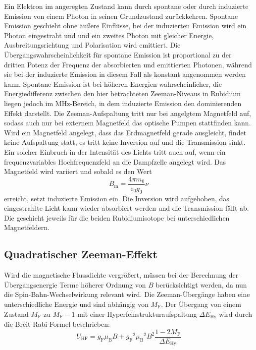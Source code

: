 Ein Elektron im angeregten Zustand kann durch spontane oder durch induzierte Emission von einem
Photon in seinen Grundzustand zurückkehren. Spontane Emission geschieht ohne äußere Einflüsse,
bei der induzierten Emission wird ein Photon eingestraht und und ein zweites Photon mit gleicher
Energie, Ausbreitungsrichtung und Polarisation wird emittiert.
Die Übergangswahrscheinlichkeit für spontane Emission ist proportional zu der dritten Potenz
der Frequenz der absorbierten und emittierten Photonen, während sie bei der induzierte Emission
in diesem Fall als konstant angenommen werden kann. Spontane Emission ist bei höheren Energien
wahrscheinlicher, die Energiedifferenz zwischen den hier betrachteten Zeeman-Niveaus in Rubidium
liegen jedoch im MHz-Bereich, in dem induzierte Emission den dominierenden Effekt darstellt.
Die Zeeman-Aufspaltung tritt nur bei angelgtem Magnetfeld auf, sodass auch nur bei externem
Magnetfeld das optische Pumpen stattfinden kann. Wird ein Magnetfeld angelegt, dass das
Erdmagnetfeld gerade ausgleicht, findet keine Aufspaltung statt, es tritt keine Inversion auf
und die Transmission sinkt. Ein solcher Einbruch in der Intensität des Lichts tritt
auch auf, wenn ein frequenzvariables Hochfrequenzfeld an die Dampfzelle angelegt wird. Das
Magnetfeld wird variiert und sobald es den Wert
\begin{equation}
  B_\text{m} = \frac{4\pi m_0}{\text{e}_0g_\text{J}}\nu
\end{equation}
erreicht, setzt induzierte Emission ein. Die Inversion wird aufgehoben, das eingestrahlte Licht
kann wieder absorbiert werden und die Transmission fällt ab. Die geschieht jeweils für die
beiden Rubidiumisotope bei unterschiedlichen Magnetfeldern.

\subsection{Quadratischer Zeeman-Effekt}

Wird die magnetische Flussdichte vergrößert, müssen bei der Berechnung der Übergangsenergie Terme höherer Ordnung von $B$
berücksichtigt werden, da nun die Spin-Bahn-Wechselwirkung relevant wird. Die Zeeman-Übergänge haben eine unterschiedliche
Energie und sind abhängig von $M_\text{F}$. Der Übergang von einem Zustand $M_\text{F}$ zu $M_\text{F}-1$ mit einer
Hyperfeinstrukturaufspaltung $\Delta E_\text{Hy}$ wird durch die Breit-Rabi-Formel beschrieben:
\begin{equation}
  U_\text{HF} = g_\text{F}\mu_\text{B}B + {g_\text{F}}^2{\mu_\text{B}}^2B^2\frac{1-2M_\text{F}}{\Delta E_\text{Hy}}
\end{equation}

